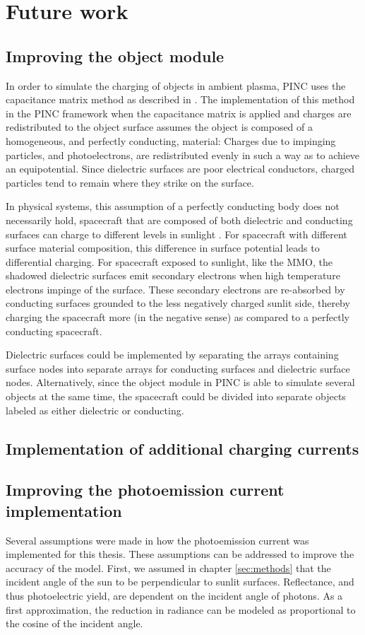 \chapter{Future work}
\label{sec:future}

\section{Improving the object module}
In order to simulate the charging of objects in ambient plasma, PINC uses the capacitance matrix method as described in \parencite{Miyake2009}. The implementation of this method in the PINC framework when the capacitance matrix is applied and charges are redistributed to the object surface assumes the object is composed of a homogeneous, and perfectly conducting, material: Charges due to impinging particles, and photoelectrons, are redistributed evenly in such a way as to achieve an equipotential. Since dielectric surfaces are poor electrical conductors, charged particles tend to remain where they strike on the surface.

In physical systems, this assumption of a perfectly conducting body does not necessarily hold, spacecraft that are composed of both dielectric and conducting surfaces can charge to different levels in sunlight \parencite{LAI2019}. For spacecraft with different surface material composition, this difference in surface potential leads to differential charging. For spacecraft exposed to sunlight, like the MMO, the shadowed dielectric surfaces emit secondary electrons when high temperature electrons impinge of the surface. These secondary electrons are re-absorbed by conducting surfaces grounded to the less negatively charged sunlit side, thereby charging the spacecraft more (in the negative sense) as compared to a perfectly conducting spacecraft. 

Dielectric surfaces could be implemented by separating the arrays containing surface nodes into separate arrays for conducting surfaces and dielectric surface nodes. Alternatively, since the object module in PINC is able to simulate several objects at the same time, the spacecraft could be divided into separate objects labeled as either dielectric or conducting.


\section{Implementation of additional charging currents}


\section{Improving the photoemission current implementation}
Several assumptions were made in how the photoemission current was implemented for this thesis. These assumptions can be addressed to improve the accuracy of the model. First, we assumed in chapter \cref{sec:methods} that the incident angle of the sun to be perpendicular to sunlit surfaces. Reflectance, and thus photoelectric yield, are dependent on the incident angle of photons. As a first approximation, the reduction in radiance can be modeled as proportional to the cosine of the incident angle. 